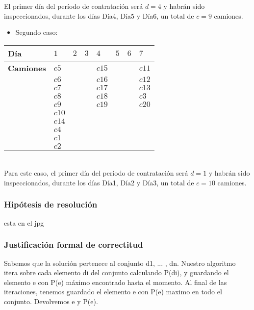\documentclass[11pt, a4paper, twoside]{article}
\begin{document}
El primer d\'ia del per\'iodo de contrataci\'on ser\'a $d=4$ y habr\'an sido inspeccionados, durante los d\'ias D\'ia4, D\'ia5 y D\'ia6, un total de $c=9$ camiones. \\

\begin{itemize}
\item Segundo caso:
\end{itemize} 

\begin{tabular}{|l|l|l|l|l|l|l|l|}
\hline
\bf Día      &  $1$  & $2$   & $3$   & $4$    & $5$ & $6$ & $7$   \\
\hline
\bf Camiones &  $c5$ &       &       & $c15$  &     &     & $c11$ \\
	         &  $c6$ &       &       & $c16$  &     &     & $c12$ \\    
			 &	$c7$ &       &       & $c17$  &     &     & $c13$ \\  
			 &	$c8$ &       &       & $c18$  &     &     & $c3$  \\
			 &	$c9$ &       &       & $c19$  &     &     & $c20$ \\
			 &	$c10$&       &       &        &     &     &       \\
			 &	$c14$&       &       &        &     &     &       \\
			 &	$c4$ &       &       &        &     &     &       \\
			 &	$c1$ &       &       &        &     &     &       \\
		     &	$c2$ &       &       &        &     &     &       \\
\hline
\end{tabular} \\

Para este caso, el primer d\'ia del per\'iodo de contrataci\'on ser\'a $d=1$ y habr\'an sido inspeccionados, durante los d\'ias D\'ia1, D\'ia2 y D\'ia3, un total de $c=10$ camiones. 


\subsubsection{Hipótesis de resolución}
esta en el jpg
\subsubsection{Justificación formal de correctitud}
Sabemos que la soluci\'on pertenece al conjunto {d1, ... , dn}. Nuestro algoritmo itera sobre cada elemento di del conjunto calculando P(di), y guardando el elemento e con P(e) m\'aximo encontrado hasta el momento. Al final de las iteraciones, tenemos guardado el elemento e con P(e) maximo en todo el conjunto. Devolvemos e y P(e).
\end{document}
